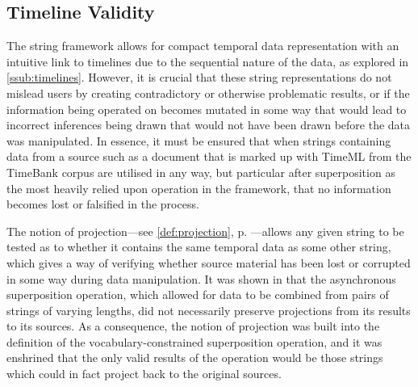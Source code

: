 \documentclass[a4paper,12pt,leqno,twoside]{article}
\begin{document}
\subsection{Timeline Validity}\label{sub:validity}
The string framework allows for compact temporal data representation with an intuitive link to timelines due to the sequential nature of the data, as explored in \cref{ssub:timelines}. However, it is crucial that these string representations do not mislead users by creating contradictory or otherwise problematic results, or if the information being operated on becomes mutated in some way that would lead to incorrect inferences being drawn that would not have been drawn before the data was manipulated. In essence, it must be ensured that when strings containing data from a source such as a document that is marked up with TimeML from the TimeBank corpus are utilised in any way, but particular after superposition as the most heavily relied upon operation in the framework, that no information becomes lost or falsified in the process.

The notion of projection---see \cref{def:projection}, p. \pageref{def:projection}---allows any given string to be tested as to whether it contains the same temporal data as some other string, which gives a way of verifying whether source material has been lost or corrupted in some way during data manipulation. It was shown in  that the asynchronous superposition operation, which allowed for data to be combined from pairs of strings of varying lengths, did not necessarily preserve projections from its results to its sources. As a consequence, the notion of projection was built into the definition of the vocabulary-constrained superposition operation, and it was enshrined that the only valid results of the operation would be those strings which could in fact project back to the original sources.
\end{document}
